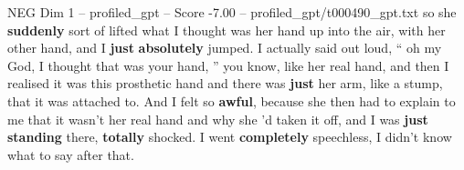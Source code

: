 \begin{textsample}{NEG Dim 1 – profiled\_gpt – Score -7.00 – profiled\_gpt/t000490\_gpt.txt}  \label{ex:f1_neg_016}
so she \textbf{suddenly} sort of lifted what I thought was her hand up into the air, with her other hand, and I \textbf{just} \textbf{absolutely} jumped.
I actually said out loud, “ oh my God, I thought that was your hand, ” you know, like her real hand, and then I realised it was this prosthetic hand and there was \textbf{just} her arm, like a stump, that it was attached to.
And I felt so \textbf{awful}, because she then had to explain to me that it wasn't her real hand and why she ’d taken it off, and I was \textbf{just} \textbf{standing} there, \textbf{totally} shocked.
I went \textbf{completely} speechless, I didn't know what to say after that.

\end{textsample}
